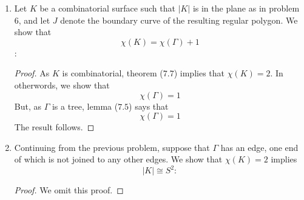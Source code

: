 \documentclass{book}
\begin{document}
\begin{enumerate}[(1)]
    \item Let $K$ be a combinatorial surface such that $|K|$ is in the plane as in problem $6$, and let $J$ denote the boundary curve of the resulting regular polygon. We show that 
        \[\chi(K) = \chi(\Gamma) + 1\]: 
        \begin{proof} As $K$ is combinatorial, theorem ($7.7$) implies that $\chi(K) = 2$. In otherwords, we show that 
            \[\chi(\Gamma) = 1\]
            But, as $\Gamma$ is a tree, lemma ($7.5$) says that 
            \[\chi(\Gamma) = 1\]
            The result follows. 
        \end{proof}

    \item Continuing from the previous problem, suppose that $\Gamma$ has an edge, one end of which is not joined to any other edges. We show that $\chi(K) = 2$ implies 
        \[|K| \cong S^2:\]
        \begin{proof} We omit this proof. 
        \end{proof}
\end{enumerate}
\end{document}
